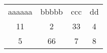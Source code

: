\begin{tabular}{cccc}
	aaaaaa & bbbbb & ccc & dd \\
	11     & 2     & 33  & 4  \\
	5      & 66    & 7   & 8
\end{tabular}
